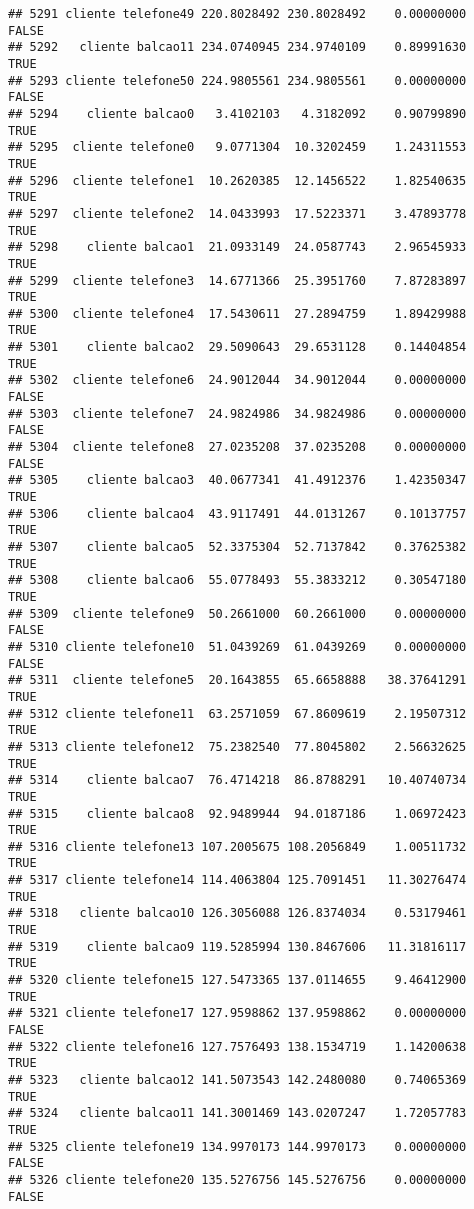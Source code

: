 \documentclass[
]{article}
\begin{document}
\begin{verbatim}
## 5291 cliente telefone49 220.8028492 230.8028492    0.00000000    FALSE
## 5292   cliente balcao11 234.0740945 234.9740109    0.89991630     TRUE
## 5293 cliente telefone50 224.9805561 234.9805561    0.00000000    FALSE
## 5294    cliente balcao0   3.4102103   4.3182092    0.90799890     TRUE
## 5295  cliente telefone0   9.0771304  10.3202459    1.24311553     TRUE
## 5296  cliente telefone1  10.2620385  12.1456522    1.82540635     TRUE
## 5297  cliente telefone2  14.0433993  17.5223371    3.47893778     TRUE
## 5298    cliente balcao1  21.0933149  24.0587743    2.96545933     TRUE
## 5299  cliente telefone3  14.6771366  25.3951760    7.87283897     TRUE
## 5300  cliente telefone4  17.5430611  27.2894759    1.89429988     TRUE
## 5301    cliente balcao2  29.5090643  29.6531128    0.14404854     TRUE
## 5302  cliente telefone6  24.9012044  34.9012044    0.00000000    FALSE
## 5303  cliente telefone7  24.9824986  34.9824986    0.00000000    FALSE
## 5304  cliente telefone8  27.0235208  37.0235208    0.00000000    FALSE
## 5305    cliente balcao3  40.0677341  41.4912376    1.42350347     TRUE
## 5306    cliente balcao4  43.9117491  44.0131267    0.10137757     TRUE
## 5307    cliente balcao5  52.3375304  52.7137842    0.37625382     TRUE
## 5308    cliente balcao6  55.0778493  55.3833212    0.30547180     TRUE
## 5309  cliente telefone9  50.2661000  60.2661000    0.00000000    FALSE
## 5310 cliente telefone10  51.0439269  61.0439269    0.00000000    FALSE
## 5311  cliente telefone5  20.1643855  65.6658888   38.37641291     TRUE
## 5312 cliente telefone11  63.2571059  67.8609619    2.19507312     TRUE
## 5313 cliente telefone12  75.2382540  77.8045802    2.56632625     TRUE
## 5314    cliente balcao7  76.4714218  86.8788291   10.40740734     TRUE
## 5315    cliente balcao8  92.9489944  94.0187186    1.06972423     TRUE
## 5316 cliente telefone13 107.2005675 108.2056849    1.00511732     TRUE
## 5317 cliente telefone14 114.4063804 125.7091451   11.30276474     TRUE
## 5318   cliente balcao10 126.3056088 126.8374034    0.53179461     TRUE
## 5319    cliente balcao9 119.5285994 130.8467606   11.31816117     TRUE
## 5320 cliente telefone15 127.5473365 137.0114655    9.46412900     TRUE
## 5321 cliente telefone17 127.9598862 137.9598862    0.00000000    FALSE
## 5322 cliente telefone16 127.7576493 138.1534719    1.14200638     TRUE
## 5323   cliente balcao12 141.5073543 142.2480080    0.74065369     TRUE
## 5324   cliente balcao11 141.3001469 143.0207247    1.72057783     TRUE
## 5325 cliente telefone19 134.9970173 144.9970173    0.00000000    FALSE
## 5326 cliente telefone20 135.5276756 145.5276756    0.00000000    FALSE

\end{verbatim}
\end{document}
